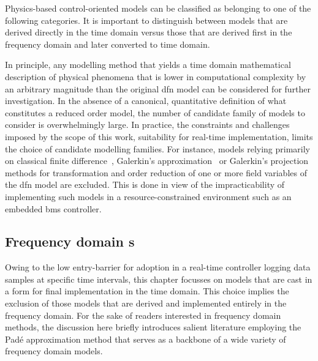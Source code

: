 Physics-based control-oriented models  can be classified as belonging  to one of
the following categories. It
is important to distinguish between models that are derived directly in the time
domain versus  those that are  derived first in  the frequency domain  and later
converted to time domain.


In  principle, any  modelling  method  that yields  a  time domain  mathematical
description of physical  phenomena that is lower in  computational complexity by
an arbitrary magnitude  than the original \gls{dfn} model can  be considered for
further investigation. In the absence of a canonical, quantitative definition of
what  constitutes a  reduced  order model,  the number  of  candidate family  of
models  to consider  is  overwhelmingly large.  In  practice,  the  constraints  and  challenges  imposed  by
the  scope  of  this  work, \viz{}  suitability  for  real-time  implementation,
limits  the  choice  of  candidate  modelling  families.  For  instance,  models
relying  primarily on  classical finite  difference~\cite{Smith2006}, Galerkin's
approximation~\cite{Dao2012}  or   Galerkin's  projection~\cite{Fan2016,Fan2018}
methods for transformation and order reduction of one or more field variables of
the \gls{dfn} model  are excluded. This is done in  view of the impracticability
of implementing  such models  in a resource-constrained  environment such  as an
embedded \gls{bms} controller.

\subsection{Frequency   domain   s}\label{subsec:freqdomainroms}

Owing to  the low entry-barrier for  adoption in a real-time  controller logging
data samples  at specific time intervals,  this chapter focusses on  models that
are cast  in a  form for final  implementation in the  time domain.  This choice
implies the exclusion of those models  that are derived and implemented entirely
in the frequency domain. For the  sake of readers interested in frequency domain
methods, the discussion here briefly introduces salient literature employing the
Padé  approximation method  that serves  as  a backbone  of a  wide variety  of
frequency domain models.


